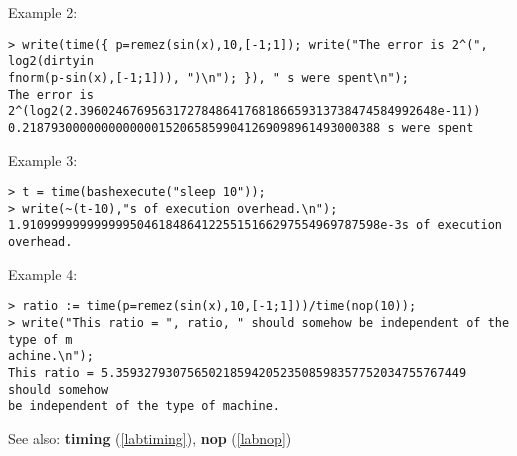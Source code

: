 \noindent Example 2: 
\begin{center}\begin{minipage}{15cm}\begin{Verbatim}[frame=single]
> write(time({ p=remez(sin(x),10,[-1;1]); write("The error is 2^(", log2(dirtyin
fnorm(p-sin(x),[-1;1])), ")\n"); }), " s were spent\n");
The error is 2^(log2(2.39602467695631727848641768186659313738474584992648e-11))
0.21879300000000000001520658599041269098961493000388 s were spent
\end{Verbatim}
\end{minipage}\end{center}
\noindent Example 3: 
\begin{center}\begin{minipage}{15cm}\begin{Verbatim}[frame=single]
> t = time(bashexecute("sleep 10"));
> write(~(t-10),"s of execution overhead.\n");
1.91099999999999950461848641225515166297554969787598e-3s of execution overhead.
\end{Verbatim}
\end{minipage}\end{center}
\noindent Example 4: 
\begin{center}\begin{minipage}{15cm}\begin{Verbatim}[frame=single]
> ratio := time(p=remez(sin(x),10,[-1;1]))/time(nop(10));
> write("This ratio = ", ratio, " should somehow be independent of the type of m
achine.\n");
This ratio = 5.3593279307565021859420523508598357752034755767449 should somehow 
be independent of the type of machine.
\end{Verbatim}
\end{minipage}\end{center}
See also: \textbf{timing} (\ref{labtiming}), \textbf{nop} (\ref{labnop})
